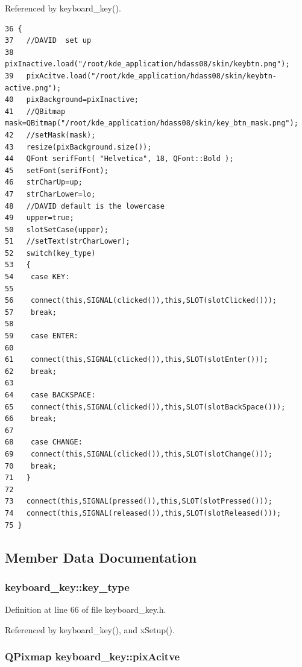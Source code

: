 Referenced by keyboard\_\-key().



\footnotesize\begin{verbatim}36 { 
37   //DAVID  set up
38   pixInactive.load("/root/kde_application/hdass08/skin/keybtn.png");
39   pixAcitve.load("/root/kde_application/hdass08/skin/keybtn-active.png");
40   pixBackground=pixInactive;
41   //QBitmap mask=QBitmap("/root/kde_application/hdass08/skin/key_btn_mask.png");
42   //setMask(mask);
43   resize(pixBackground.size());
44   QFont serifFont( "Helvetica", 18, QFont::Bold );
45   setFont(serifFont); 
46   strCharUp=up;
47   strCharLower=lo;
48   //DAVID default is the lowercase
49   upper=true;
50   slotSetCase(upper);
51   //setText(strCharLower);
52   switch(key_type)
53   {
54    case KEY:
55    
56    connect(this,SIGNAL(clicked()),this,SLOT(slotClicked()));
57    break;
58    
59    case ENTER:
60    
61    connect(this,SIGNAL(clicked()),this,SLOT(slotEnter()));
62    break;
63    
64    case BACKSPACE:
65    connect(this,SIGNAL(clicked()),this,SLOT(slotBackSpace()));
66    break;  
67    
68    case CHANGE:
69    connect(this,SIGNAL(clicked()),this,SLOT(slotChange()));
70    break; 
71   }
72   
73   connect(this,SIGNAL(pressed()),this,SLOT(slotPressed()));
74   connect(this,SIGNAL(released()),this,SLOT(slotReleased()));
75 }
\end{verbatim}\normalsize 


\subsection{Member Data Documentation}
\subsubsection{ {\bf keyboard\_\-key::key\_\-type}\hspace{0.3cm}{\tt  [private]}}\label{classkeyboard__key_keyboard__keyr7}




Definition at line 66 of file keyboard\_\-key.h.

Referenced by keyboard\_\-key(), and x\-Setup().
\subsubsection{\setlength{\rightskip}{0pt plus 5cm}QPixmap {\bf keyboard\_\-key::pix\-Acitve}\hspace{0.3cm}{\tt  [private]}}\label{classkeyboard__key_keyboard__keyr5}





